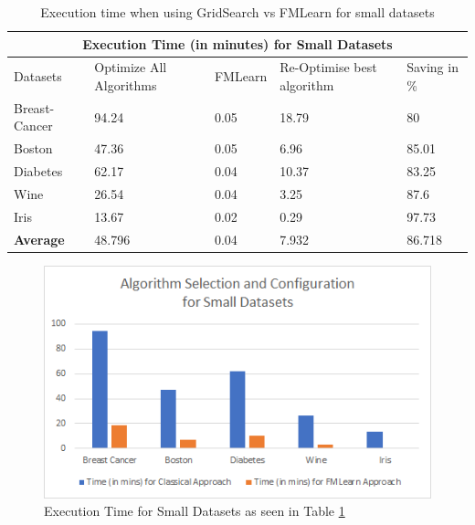 \begin{table}[H]
\centering 
\vspace*{+5pt}
 \begin{tabular}{ |p{1in}||p{1in}|p{0.7in}|p{1in}|p{0.8in}|  }
 \hline
 \multicolumn{5}{|c|}{Execution Time (in minutes) for Small Datasets} \\
 \hline
 Datasets & Optimize All Algorithms & FMLearn & Re-Optimise best algorithm & Saving in \%\\
 \hline
 Breast-Cancer & 94.24 & 0.05 & 18.79 & 80 \\
 \hline
 Boston & 47.36 & 0.05 & 6.96 & 85.01 \\
 \hline
 Diabetes & 62.17 & 0.04 & 10.37 & 83.25 \\
 \hline
 Wine & 26.54 & 0.04 & 3.25 & 87.6 \\
 \hline
 Iris & 13.67 & 0.02 & 0.29 & 97.73 \\
 \hline
 \hline
 \textbf{Average} & 48.796 & 0.04  & 7.932 & 86.718 \\
 \hline
\end{tabular}
\vspace*{+5pt}
\caption{Execution time when using GridSearch vs FMLearn for small datasets}
\label{table:1}
\end{table}
\vspace*{-10pt}

\begin{figure}[H]
    \centering
    \includegraphics[width=15cm]{images/Small Datasets.png}
    \caption{Execution Time for Small Datasets as seen in Table \ref{table:1}}
    \label{fig:small_dataset}
\end{figure}

